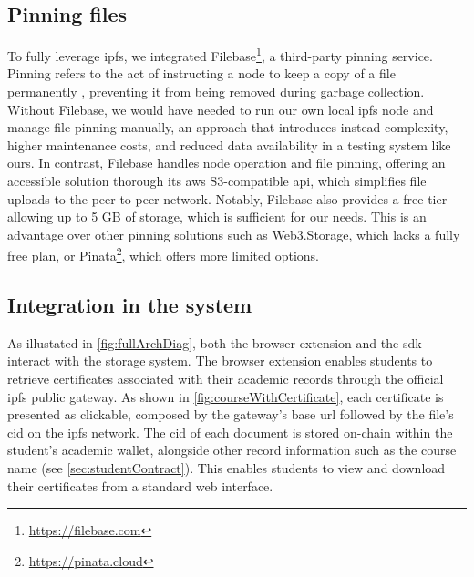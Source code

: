 \subsection{Pinning files}
\label{ssec:pinningService}
To fully leverage \acrshort{ipfs}, we integrated Filebase\footnote{\url{https://filebase.com}}, a third-party pinning service. Pinning refers to the act of instructing a node to keep a copy of a file permanently \cite{benet2014ipfscontentaddressed}, preventing it from being removed during garbage collection. Without Filebase, we would have needed to run our own local \acrshort{ipfs} node and manage file pinning manually, an approach that introduces instead complexity, higher maintenance costs, and reduced data availability in a testing system like ours. In contrast, Filebase handles node operation and file pinning, offering an accessible solution thorough its \acrfull{aws} S3-compatible \acrshort{api}, which simplifies file uploads to the peer-to-peer network. Notably, Filebase also provides a free tier allowing up to 5 GB of storage, which is sufficient for our needs. This is an advantage over other pinning solutions such as Web3.Storage, which lacks a fully free plan, or Pinata\footnote{\url{https://pinata.cloud}}, which offers more limited options.

\subsection{Integration in the system}
As illustated in \cref{fig:fullArchDiag}, both the browser extension and the \acrshort{sdk} interact with the storage system. The browser extension enables students to retrieve certificates associated with their academic records through the official \acrshort{ipfs} public gateway. As shown in \cref{fig:courseWithCertificate}, each certificate is presented as clickable, composed by the gateway's base \acrshort{url} followed by the file's \acrfull{cid} on the \acrshort{ipfs} network. The \acrshort{cid} of each document is stored on-chain within the student's academic wallet, alongside other record information such as the course name (see \cref{sec:studentContract}). This enables students to view and download their certificates from a standard web interface.

